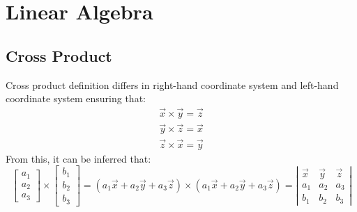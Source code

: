 \documentclass[12pt]{article}
\begin{document}
\section{Linear Algebra}
    \subsection{Cross Product}
    Cross product definition differs in right-hand coordinate system and left-hand
    coordinate system ensuring that:
    \[ \begin{array}{c}
        \overrightarrow{x} \times \overrightarrow{y} = \overrightarrow{z} \\
        \overrightarrow{y} \times \overrightarrow{z} = \overrightarrow{x} \\
        \overrightarrow{z} \times \overrightarrow{x} = \overrightarrow{y}
    \end{array} \]
    From this, it can be inferred that:
    \[
        \left[ \begin{array}{c}
            a_1 \\ a_2 \\ a_3
        \end{array} \right]
        \times
        \left[ \begin{array}{c}
            b_1 \\ b_2 \\ b_3
        \end{array} \right]
        =
        \left(
            a_1\overrightarrow{x} + a_2\overrightarrow{y} + a_3\overrightarrow{z}
        \right)
        \times
        \left(
            a_1\overrightarrow{x} + a_2\overrightarrow{y} + a_3\overrightarrow{z}
        \right)
        =
        \left| \begin{array}{ccc}
            \overrightarrow{x} & \overrightarrow{y} & \overrightarrow{z} \\
            a_1 & a_2 & a_3 \\
            b_1 & b_2 & b_3
        \end{array} \right|
    \]
\end{document}
